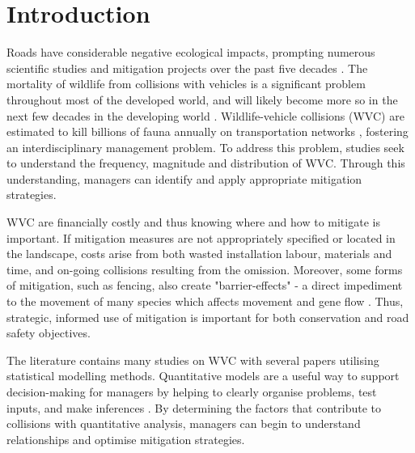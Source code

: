 \newpage
\section{Introduction}

Roads have considerable negative ecological impacts, prompting numerous scientific studies and mitigation projects over the past five decades \citep{form98,spel98,rvdr15}. The mortality of wildlife from collisions with vehicles is a significant problem throughout most of the developed world, and will likely become more so in the next few decades in the developing world \citep{rvdr15}. Wildlife-vehicle collisions (WVC) are estimated to kill billions of fauna annually on transportation networks \citep{seil06}, fostering an interdisciplinary management problem. To address this problem, studies seek to understand the frequency, magnitude and distribution of WVC.  Through this understanding, managers can identify and apply appropriate mitigation strategies.

WVC are financially costly \citep{biss08b,huij09,rowd08} and thus knowing where and how to mitigate is important.  If mitigation measures are not appropriately specified or located in the landscape, costs arise from both wasted installation labour, materials and time, and on-going collisions resulting from the omission.  Moreover, some forms of mitigation, such as fencing, also create "barrier-effects" - a direct impediment to the movement of many species which affects movement and gene flow \citep{epps05}.  Thus, strategic, informed use of mitigation is important for both conservation and road safety objectives.

The literature contains many studies on WVC with several papers utilising statistical modelling methods.  Quantitative models are a useful way to support decision-making for managers by helping to clearly organise problems, test inputs, and make inferences \citep{ande15}.  By determining the factors that contribute to collisions with quantitative analysis, managers can begin to understand relationships and optimise mitigation strategies.

